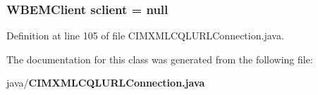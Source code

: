 \subsubsection[{sclient}]{\setlength{\rightskip}{0pt plus 5cm}W\+B\+E\+M\+Client sclient = null\hspace{0.3cm}{\ttfamily [protected]}}\label{classorg_1_1smallfoot_1_1parser_1_1cimcql_1_1CIMXMLCQLURLConnection_a228431d1972b2a4462cdebbe63002fdf}


Definition at line 105 of file C\+I\+M\+X\+M\+L\+C\+Q\+L\+U\+R\+L\+Connection.\+java.



The documentation for this class was generated from the following file\+:\begin{DoxyCompactItemize}
\item 
java/{\bf C\+I\+M\+X\+M\+L\+C\+Q\+L\+U\+R\+L\+Connection.\+java}\end{DoxyCompactItemize}
